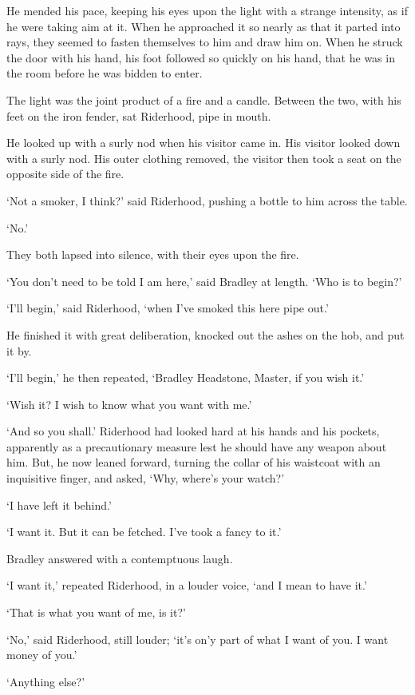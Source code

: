 He mended his pace, keeping his eyes upon the light with a strange
intensity, as if he were taking aim at it. When he approached it so
nearly as that it parted into rays, they seemed to fasten themselves
to him and draw him on. When he struck the door with his hand, his foot
followed so quickly on his hand, that he was in the room before he was
bidden to enter.

The light was the joint product of a fire and a candle. Between the two,
with his feet on the iron fender, sat Riderhood, pipe in mouth.

He looked up with a surly nod when his visitor came in. His visitor
looked down with a surly nod. His outer clothing removed, the visitor
then took a seat on the opposite side of the fire.

‘Not a smoker, I think?’ said Riderhood, pushing a bottle to him across
the table.

‘No.’

They both lapsed into silence, with their eyes upon the fire.

‘You don’t need to be told I am here,’ said Bradley at length. ‘Who is
to begin?’

‘I’ll begin,’ said Riderhood, ‘when I’ve smoked this here pipe out.’

He finished it with great deliberation, knocked out the ashes on the
hob, and put it by.

‘I’ll begin,’ he then repeated, ‘Bradley Headstone, Master, if you wish
it.’

‘Wish it? I wish to know what you want with me.’

‘And so you shall.’ Riderhood had looked hard at his hands and his
pockets, apparently as a precautionary measure lest he should have any
weapon about him. But, he now leaned forward, turning the collar of
his waistcoat with an inquisitive finger, and asked, ‘Why, where’s your
watch?’

‘I have left it behind.’

‘I want it. But it can be fetched. I’ve took a fancy to it.’

Bradley answered with a contemptuous laugh.

‘I want it,’ repeated Riderhood, in a louder voice, ‘and I mean to have
it.’

‘That is what you want of me, is it?’

‘No,’ said Riderhood, still louder; ‘it’s on’y part of what I want of
you. I want money of you.’

‘Anything else?’

